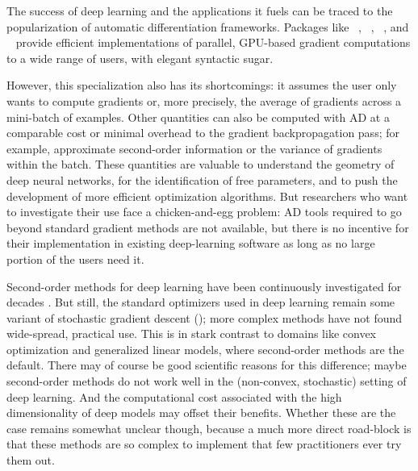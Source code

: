 The success of deep learning and the applications it fuels can be traced to the
popularization of automatic differentiation frameworks. Packages like
\TensorFlow~\citep{abadi2016tensorflow}, \Chainer~\citep{tokui2015chainer},
\MXNet~\citep{chen2015mxnet}, and \PyTorch~\citep{paszke2019pytorch} provide
efficient implementations of parallel, GPU-based gradient computations to a wide
range of users, with elegant syntactic sugar.

However, this specialization also has its shortcomings: it assumes the user only
wants to compute gradients or, more precisely, the average of gradients across a
mini-batch of examples. Other quantities can also be computed with AD at a
comparable cost or minimal overhead to the gradient backpropagation pass; for
example, approximate second-order information or the variance of gradients
within the batch. These quantities are valuable to understand the geometry of
deep neural networks, for the identification of free parameters, and to push the
development of more efficient optimization algorithms. But researchers who want
to investigate their use face a chicken-and-egg problem: AD tools required to go
beyond standard gradient methods are not available, but there is no incentive
for their implementation in existing deep-learning software as long as no large
portion of the users need it.

Second-order methods for deep learning have been continuously investigated for
decades \citep[\eg][]{becker1988improving,amari1998natural,bordes2009sgdqn,
  martens2015optimizing}. But still, the standard optimizers used in deep
learning remain some variant of stochastic gradient descent (\SGD); more complex
methods have not found wide-spread, practical use. This is in stark contrast to
domains like convex optimization and generalized linear models, where
second-order methods are the default. There may of course be good scientific
reasons for this difference; maybe second-order methods do not work well in the
(non-convex, stochastic) setting of deep learning. And the computational cost
associated with the high dimensionality of deep models may offset their
benefits. Whether these are the case remains somewhat unclear though, because a
much more direct road-block is that these methods are so complex to implement
that few practitioners ever try them out.

